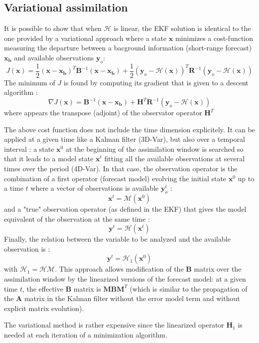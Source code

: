 \documentclass[12pt]{article}
\begin{document}
\subsection{Variational assimilation}
It is possible to show that when $\mathcal{H}$ is linear,
the EKF solution is identical to the one provided by a variational
approach where a state $\mathbf{x}$ minimizes a cost-function
measuring the departure between a bacground information (short-range forecast)
$\mathbf{x_b}$ and available observations $\mathbf{y}_o$:
\[
J(\mathbf{x}) = \frac{1}{2}(\mathbf{x} - \mathbf{x_b})^T \mathbf{B}^{-1}
 (\mathbf{x} - \mathbf{x_b}) +
\frac{1}{2} 
(\mathbf{y}_o -  \mathcal{H}(\mathbf{x}))^T  \mathbf{R}^{-1}
(\mathbf{y}_o -  \mathcal{H}(\mathbf{x}))
\]
The minimum of $J$ is found by computing its gradient that is
given to a descent algorithm :
 \[
\nabla J(\mathbf{x}) =  \mathbf{B}^{-1}
 (\mathbf{x} - \mathbf{x_b}) +
\mathbf{H}^T\mathbf{R}^{-1}
(\mathbf{y}_o -  \mathcal{H}(\mathbf{x}))
\]
where appears 
the transpose (adjoint) of the observator operator $\mathbf{H}^T$ 
\par 
The above cost function does not include the time dimension explicitely.
It can be applied at a given time like a Kalman filter (3D-Var),
but also over a temporal interval : a state $\mathbf{x}^0$
at the beginning of the assimilation window is searched so that it leads to
a model state $\mathbf{x}^t$ fitting all the available
observations at several times over the period (4D-Var).
In that case, the observation operator is the combination of
a first operator (forecast model) evolving the initial state $\mathbf{x}^0$
up to a time $t$ where a vector of observations is available $\mathbf{y}_o^t$ :
\[
\mathbf{x}^t = \mathcal{M}(\mathbf{x}^0)
\]
and a "true" observation operator (as defined in the EKF)
that gives the model equivalent of the observation at the same time :
\[
\mathbf{y}^t =  \mathcal{H}(\mathbf{x}^t)
\]
Finally, the relation between the variable to be analyzed and the available
observation is :
\[
\mathbf{y}^t =  \mathcal{H}_1  (\mathbf{x}^0)
\]
with $\mathcal{H }_1= \mathcal{H}\mathcal{M}$.
This approach allows modification of the $\mathbf{B}$ matrix over the
assimilation window by the linearized versions of the
forecast model: at a given time $t$, the effective $\mathbf{B}$
matrix is $\mathbf{MBM}^T$ (which is similar to
the propagation of the $\mathbf{A}$ matrix in the Kalman filter
without the error model term and without explicit matrix evolution).

The variational method is rather expensive since the linearized
operator
 $\mathbf{H}_1$ is needed at each iteration of a minimization
algorithm.
\end{document}
